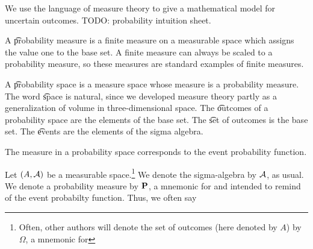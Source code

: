 

We use the language of measure theory to give a mathematical model for uncertain outcomes.
TODO: probability intuition sheet.


A \t{probability measure} is a finite measure on a measurable space which assigns the value one to the base set.
A finite measure can always be scaled to a probability measure, so these measures are standard examples of finite measures.

A \t{probability space} is a measure space whose measure is a probability measure.
The word \t{space} is natural, since we developed measure theory partly as a generalization of volume in three-dimensional space.
The \t{outcomes} of a probability space are the elements of the base set.
The \t{set of outcomes} is the base set.
The \t{events} are the elements of the sigma algebra.

The measure in a probability space corresponds to the event probability function.


Let $(A, \mathcal{A})$ be a measurable space.\footnote{Often, other authors will denote the set of outcomes (here denoted by $A$) by $\Omega$, a mnemonic for }
We denote the sigma-algebra by $\mathcal{A}$, as usual.
We denote a probability measure by $\mathbf{P}$, a mnemonic for  and intended to remind of the event probabilty function.
Thus, we often say 

